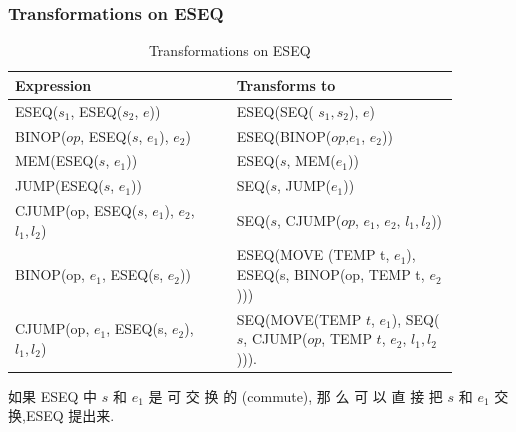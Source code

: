 \subsubsection{Transformations on ESEQ}

\begin{table}[H]
    \centering
    \small
    \caption{Transformations on ESEQ}
    \begin{tabular}[c]{L{0.44\linewidth}L{0.44\linewidth}}\toprule 
        Expression & Transforms to \\ \midrule
        ESEQ($s_1$, ESEQ($s_2$, $e$)) & ESEQ(SEQ( $s_1,s_2$), $e$) \\
        BINOP($op$, ESEQ($s$, $e_1$), $e_2$) & ESEQ(BINOP($op$,$e_1$, $e_2$)) \\
        MEM(ESEQ($s$, $e_1$)) & ESEQ($s$, MEM($e_1$))  \\
        JUMP(ESEQ($s$, $e_1$)) & SEQ($s$, JUMP($e_1$)) \\
        CJUMP(op, ESEQ($s$, $e_1$), $e_2$, $l_1,l_2$) & SEQ($s$, CJUMP($op$, $e_1$, $e_2$, $l_1,l_2$)) \\
        BINOP(op, $e_1$, ESEQ(s, $e_2$)) & ESEQ(MOVE (TEMP t, $e_1$), ESEQ(s, BINOP(op, TEMP t, $e_2$))) \\ 
        CJUMP(op, $e_1$, ESEQ(s, $e_2$), $l_1,l_2$) &  SEQ(MOVE(TEMP $t$, $e_1$), SEQ($s$, CJUMP($op$, TEMP $t$, $e_2$, $l_1,l_2$))). \\
        \bottomrule
    \end{tabular}
\end{table}
如果 ESEQ 中 $s$ 和 $e_1$ 是 可 交 换 的 (commute), 那 么 可 以 直 接 把 $s$ 和 $e_1$ 交换,ESEQ 提出来. 

